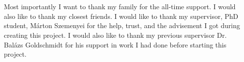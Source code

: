 \chapter*{\koszonetnyilvanitas}

Most importantly I want to thank my family for the all-time support.
I would also like to thank my closest friends. I would like to thank my supervisor, 
PhD student, Márton Szemenyei for the help,
trust, and the advisement I got during creating this project. I would also like
to thank my previous supervisor Dr. Balázs Goldschmidt for his support in work I
had done before starting this project. 